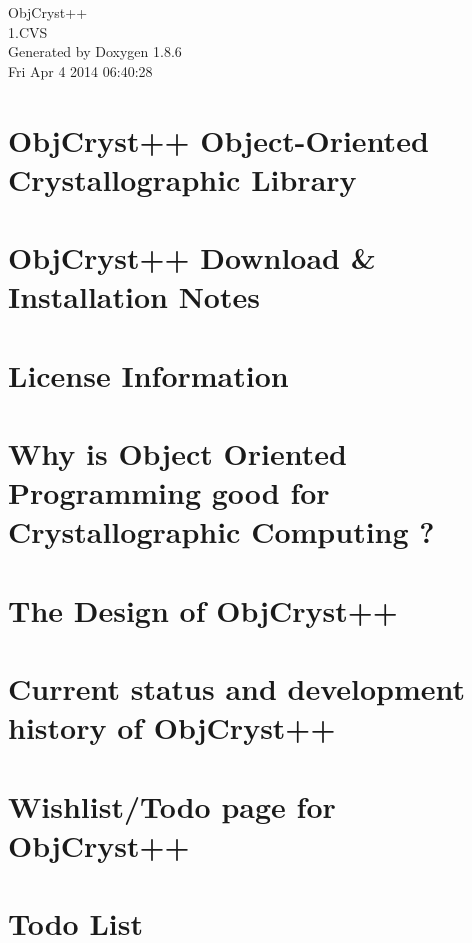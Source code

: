 \documentclass[twoside]{article}
\begin{document}
\begin{titlepage}
\vspace*{7cm}
\begin{center}%
{\Large Obj\-Cryst++ \\[1ex]\large 1.\-C\-V\-S }\\
\vspace*{1cm}
{\large Generated by Doxygen 1.8.6}\\
\vspace*{0.5cm}
{\small Fri Apr 4 2014 06:40:28}\\
\end{center}
\end{titlepage}
\tableofcontents
{}

\section{Obj\-Cryst++ Object-\/\-Oriented Crystallographic Library}
\label{index}
\section{Obj\-Cryst++ Download \& Installation Notes}
\label{a00002}

\section{License Information}
\label{a00004}

\section{Why is Object Oriented Programming good for Crystallographic Computing ?}
\label{a00006}

\section{The Design of Obj\-Cryst++}
\label{a00008}

\section{Current status and development history of Obj\-Cryst++}
\label{a00010}

\section{Wishlist/\-Todo page for Obj\-Cryst++}
\label{a00012}

\section{Todo List}
\label{a00229}

\end{document}
